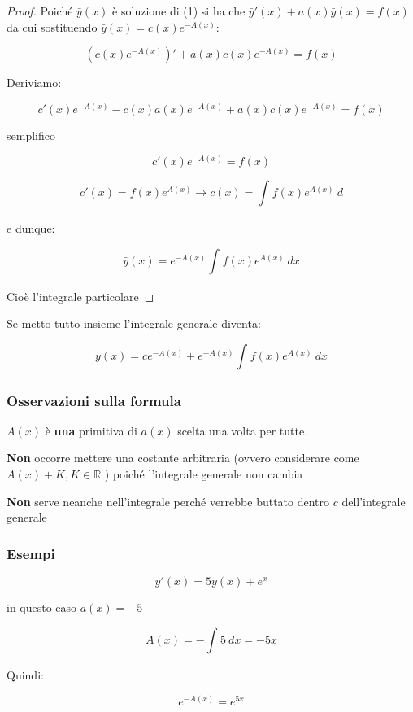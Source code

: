 \documentclass[11pt]{article}
\begin{document}
\begin{proof}
    Poiché $\bar y(x)$ è soluzione di (1) si ha che $\bar y'(x)+a(x) \bar y(x)=f(x)$ da cui sostituendo $\bar y(x) = c(x) e ^{-A(x)}$:

    \[
        (c(x) e ^{-A(x)})'+ a(x) c(x) e ^{-A(x)} = f(x)
    \]
    
    Deriviamo:

    \[
        c'(x) e ^{-A(x)} - c(x) a(x) e ^{-A(x)} + a(x) c(x) e ^{-A(x)}= f(x)
    \]
    
    semplifico

    \[
        c'(x) e ^{-A(x)} = f(x)
    \]

    \[
        c'(x) = f(x) e ^{A(x)} \rightarrow c(x) = \int_{{}}^{{}} {f(x) e ^{A(x)}} \: d{} {}
    \]

    e dunque:

    \[
        \bar y(x) = e ^{-A(x)} \int_{{}}^{{}} {f(x) e ^{A(x)}} \: d{x} {}
    \]

    Cioè l'integrale particolare
\end{proof}

Se metto tutto insieme l'integrale generale diventa:

\[
    y(x) = c e ^{-A(x)} + e ^{-A(x)} \int_{{}}^{{}} {f(x) e ^{A(x)}} \: d{x} {}
\]

\subsubsection{Osservazioni sulla formula}

$A(x)$ è \textbf{una} primitiva di $a(x)$ scelta una volta per tutte.

\textbf{Non} occorre mettere una costante arbitraria (ovvero considerare come $A(x) + K,K \in \mathbb{R}$ ) poiché l'integrale generale non cambia

\textbf{Non} serve neanche nell'integrale perché verrebbe buttato dentro $c$ dell'integrale generale


\subsubsection{Esempi}

\[
    y'(x) = 5y(x) + e ^{x}
\]

in questo caso $a(x) = -5$

\[
    A(x) = - \int_{{}}^{{}} {5} \: d{x} {}=-5x
\]

Quindi: 

\[
    e ^{-A(x)}=e ^{5x}
\]
\end{document}
